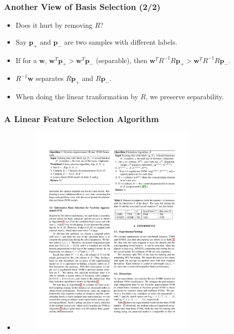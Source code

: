 \documentclass{beamer}
\def\bw{{\boldsymbol w}}
\def\bp{{\boldsymbol p}}
\begin{document}
\begin{frame}
  \frametitle{Another View of Basis Selection (2/2)}
  \begin{itemize}
    \item Does it hurt by removing $R$?
    \pause
    \item Say $\bp_+$ and $\bp_-$ are two samples with different labels.
    \pause
    \item If for a $\bw$, $\bw^T\bp_+ > \bw^T\bp_-$ (separable), then
    $\bw^TR^{-1}R\bp_+  > \bw^TR^{-1}R\bp_-$.
    \pause
    \item $R^{-1}\bw$ separates $R\bp_+$ and $R\bp_-$.
    \pause
    \item When doing the linear tranformation by $R$, we preserve separability.
  \end{itemize}
\end{frame}

\begin{frame}
  \frametitle{A Linear Feature Selection Algorithm}
  \begin{itemize}
   \item []
    \begin{figure}
      \includegraphics[width=3.2in]{algo2.pdf}\\
    \end{figure}
  \end{itemize}
\end{frame}
\end{document}
